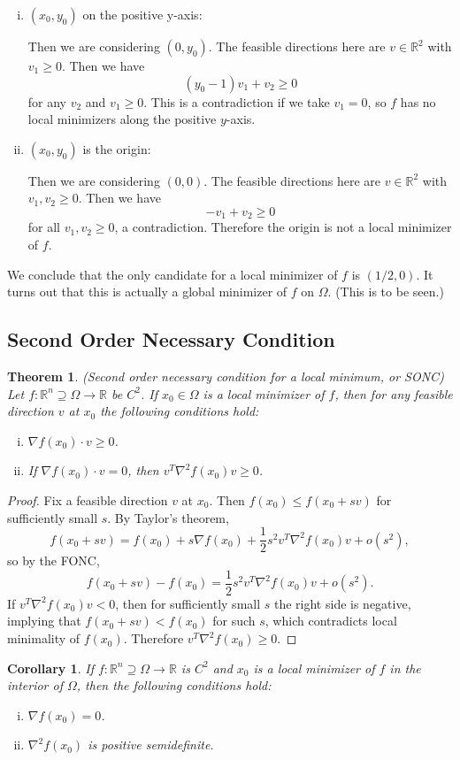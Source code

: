\documentclass[11pt]{article}
\newcommand{\R}{\mathbb{R}}
\newtheorem{theorem}{Theorem}[subsection]
\newtheorem{corollary}{Corollary}[subsection]
\begin{document}
\begin{enumerate}
\begin{enumerate}[(i)]
\item $(x_0, y_0)$ on the positive y-axis:

Then we are considering $(0, y_0)$. The feasible directions here are $v \in \R^2$ with $v_1 \geq 0$. Then we have
\[
(y_0 - 1)v_1 + v_2 \geq 0
\]
for any $v_2$ and $v_1 \geq 0$. This is a contradiction if we take $v_1 = 0$, so $f$ has no local minimizers along the positive $y$-axis.

\item $(x_0, y_0)$ is the origin:

Then we are considering $(0,0)$. The feasible directions here are $v \in \R^2$ with $v_1, v_2 \geq 0$. Then we have
\[
-v_1 + v_2 \geq 0
\]
for all $v_1, v_2 \geq 0$, a contradiction. Therefore the origin is not a local minimizer of $f$.
\end{enumerate}
We conclude that the only candidate for a local minimizer of $f$ is $(1/2, 0)$. It turns out that this is actually a global minimizer of $f$ on $\Omega$. (This is to be seen.)
\end{enumerate}

\subsection{Second Order Necessary Condition}

\begin{theorem}
(Second order necessary condition for a local minimum, or SONC) Let $f : \R^n \supseteq \Omega \to \R$ be $C^2$. If $x_0 \in \Omega$ is a local minimizer of $f$, then for any feasible direction $v$ at $x_0$ the following conditions hold:
\begin{enumerate}[(i)]
\item $\nabla f(x_0) \cdot v \geq 0$.
\item If $\nabla f(x_0) \cdot v = 0$, then $v^T \nabla^2 f(x_0) v \geq 0$.
\end{enumerate}
\end{theorem}
\begin{proof}
Fix a feasible direction $v$ at $x_0$. Then $f(x_0) \leq f(x_0 + sv)$ for sufficiently small $s$. By Taylor's theorem,
\[
f(x_0 + sv) = f(x_0) + s \nabla f(x_0) + \frac{1}{2} s^2 v^T \nabla^2 f(x_0) v + o(s^2),
\]
so by the FONC,
\[
f(x_0 + sv) - f(x_0) = \frac{1}{2} s^2 v^T \nabla^2 f(x_0) v + o(s^2).
\]
If $v^T \nabla^2 f(x_0) v < 0$, then for sufficiently small $s$ the right side is negative, implying that $f(x_0 + sv) < f(x_0)$ for such $s$, which contradicts local minimality of $f(x_0)$. Therefore $v^T \nabla^2 f(x_0) \geq 0$.
\end{proof}
\begin{corollary}
If $f : \R^n \supseteq \Omega \to \R$ is $C^2$ and $x_0$ is a local minimizer of $f$ in the interior of $\Omega$, then the following conditions hold:
\begin{enumerate}[(i)]
\item $\nabla f(x_0) = 0$.
\item $\nabla^2 f(x_0)$ is positive semidefinite.
\end{enumerate}
\end{corollary}
\end{document}
